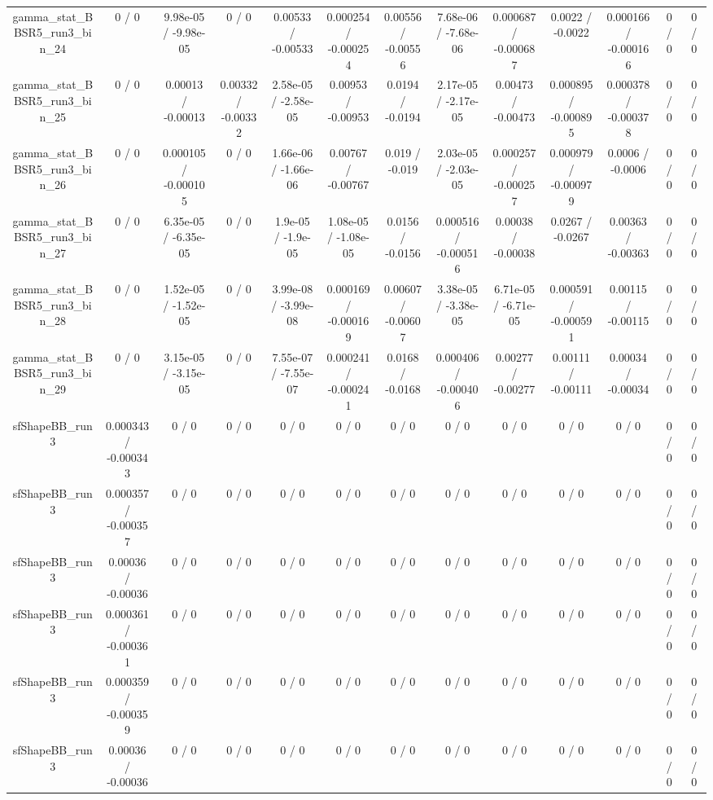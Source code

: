 \documentclass[10pt]{article}
\begin{document}
\begin{table}[htbp]
\begin{center}
\begin{tabular}{|c|c|c|c|c|c|c|c|c|c|c|c|c|}
  gamma_stat_BBSR5_run3_bin_24 & 0 / 0 & 9.98e-05 / -9.98e-05 & 0 / 0 & 0.00533 / -0.00533 & 0.000254 / -0.000254 & 0.00556 / -0.00556 & 7.68e-06 / -7.68e-06 & 0.000687 / -0.000687 & 0.0022 / -0.0022 & 0.000166 / -0.000166 & 0 / 0 & 0 / 0 \\ 
  gamma_stat_BBSR5_run3_bin_25 & 0 / 0 & 0.00013 / -0.00013 & 0.00332 / -0.00332 & 2.58e-05 / -2.58e-05 & 0.00953 / -0.00953 & 0.0194 / -0.0194 & 2.17e-05 / -2.17e-05 & 0.00473 / -0.00473 & 0.000895 / -0.000895 & 0.000378 / -0.000378 & 0 / 0 & 0 / 0 \\ 
  gamma_stat_BBSR5_run3_bin_26 & 0 / 0 & 0.000105 / -0.000105 & 0 / 0 & 1.66e-06 / -1.66e-06 & 0.00767 / -0.00767 & 0.019 / -0.019 & 2.03e-05 / -2.03e-05 & 0.000257 / -0.000257 & 0.000979 / -0.000979 & 0.0006 / -0.0006 & 0 / 0 & 0 / 0 \\ 
  gamma_stat_BBSR5_run3_bin_27 & 0 / 0 & 6.35e-05 / -6.35e-05 & 0 / 0 & 1.9e-05 / -1.9e-05 & 1.08e-05 / -1.08e-05 & 0.0156 / -0.0156 & 0.000516 / -0.000516 & 0.00038 / -0.00038 & 0.0267 / -0.0267 & 0.00363 / -0.00363 & 0 / 0 & 0 / 0 \\ 
  gamma_stat_BBSR5_run3_bin_28 & 0 / 0 & 1.52e-05 / -1.52e-05 & 0 / 0 & 3.99e-08 / -3.99e-08 & 0.000169 / -0.000169 & 0.00607 / -0.00607 & 3.38e-05 / -3.38e-05 & 6.71e-05 / -6.71e-05 & 0.000591 / -0.000591 & 0.00115 / -0.00115 & 0 / 0 & 0 / 0 \\ 
  gamma_stat_BBSR5_run3_bin_29 & 0 / 0 & 3.15e-05 / -3.15e-05 & 0 / 0 & 7.55e-07 / -7.55e-07 & 0.000241 / -0.000241 & 0.0168 / -0.0168 & 0.000406 / -0.000406 & 0.00277 / -0.00277 & 0.00111 / -0.00111 & 0.00034 / -0.00034 & 0 / 0 & 0 / 0 \\ 
  sfShapeBB_run3 & 0.000343 / -0.000343 & 0 / 0 & 0 / 0 & 0 / 0 & 0 / 0 & 0 / 0 & 0 / 0 & 0 / 0 & 0 / 0 & 0 / 0 & 0 / 0 & 0 / 0 \\ 
  sfShapeBB_run3 & 0.000357 / -0.000357 & 0 / 0 & 0 / 0 & 0 / 0 & 0 / 0 & 0 / 0 & 0 / 0 & 0 / 0 & 0 / 0 & 0 / 0 & 0 / 0 & 0 / 0 \\ 
  sfShapeBB_run3 & 0.00036 / -0.00036 & 0 / 0 & 0 / 0 & 0 / 0 & 0 / 0 & 0 / 0 & 0 / 0 & 0 / 0 & 0 / 0 & 0 / 0 & 0 / 0 & 0 / 0 \\ 
  sfShapeBB_run3 & 0.000361 / -0.000361 & 0 / 0 & 0 / 0 & 0 / 0 & 0 / 0 & 0 / 0 & 0 / 0 & 0 / 0 & 0 / 0 & 0 / 0 & 0 / 0 & 0 / 0 \\ 
  sfShapeBB_run3 & 0.000359 / -0.000359 & 0 / 0 & 0 / 0 & 0 / 0 & 0 / 0 & 0 / 0 & 0 / 0 & 0 / 0 & 0 / 0 & 0 / 0 & 0 / 0 & 0 / 0 \\ 
  sfShapeBB_run3 & 0.00036 / -0.00036 & 0 / 0 & 0 / 0 & 0 / 0 & 0 / 0 & 0 / 0 & 0 / 0 & 0 / 0 & 0 / 0 & 0 / 0 & 0 / 0 & 0 / 0 \\ 

\end{tabular}
\end{center}
\end{table}
\end{document}
